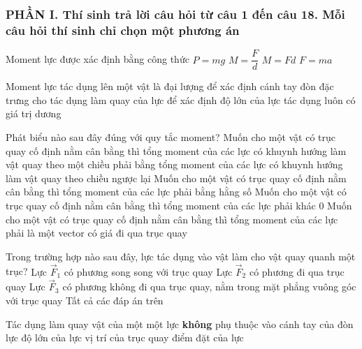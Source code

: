 \subsubsection*{PHẦN I. Thí sinh trả lời câu hỏi từ câu 1 đến câu 18. Mỗi câu hỏi thí sinh chỉ chọn một phương án}
\setcounter{ex}{0}
\begin{ex}%
Moment lực được xác định bằng công thức
\choice
{$P = mg$}
{$M = \dfrac{F}{d}$}
{ \True $M = Fd$}
{$F = ma$}
\end{ex}
\begin{ex}%
Moment lực tác dụng lên một vật là đại lượng
\choice
{để xác định cánh tay đòn}
{\True đặc trưng cho tác dụng làm quay của lực}
{để xác định độ lớn của lực tác dụng}
{luôn có giá trị dương}
\end{ex}
\begin{ex}%
Phát biểu nào sau đây đúng với quy tắc moment?
\choice
{\True Muốn cho một vật có trục quay cố định nằm cân bằng thì tổng moment của các lực có khuynh hướng làm vật quay theo một chiều phải bằng tổng moment của các lực có khuynh hướng làm vật quay theo chiều ngược lại}
{Muốn cho một vật có trục quay cố định nằm cân bằng thì tổng moment của các lực phải bằng hằng số}
{Muốn cho một vật có trục quay cố định nằm cân bằng thì tổng moment của các lực phải khác 0}
{Muốn cho một vật có trục quay cố định nằm cân bằng thì tổng moment của các lực phải là một vector có giá đi qua trục quay}
\end{ex}
\begin{ex}%
Trong trường hợp nào sau đây, lực tác dụng vào vật làm cho vật quay quanh một trục?
\choice
{Lực $\vec F_1 $ có phương song song với trục quay}
{Lực $\vec F_2 $ có phương đi qua trục quay}
{\True Lực $\vec F_3 $ có phương không đi qua trục quay, nằm trong mặt phẳng vuông góc với trục quay}
{Tất cả các đáp án trên}
\end{ex}
\begin{ex}%
Tác dụng làm quay vật của một một lực \textbf{không} phụ thuộc vào
\choice
{cánh tay của đòn lực}
{độ lớn của lực}
{vị trí của trục quay}
{\True điểm đặt của lực}
\loigiai{}
\end{ex}
